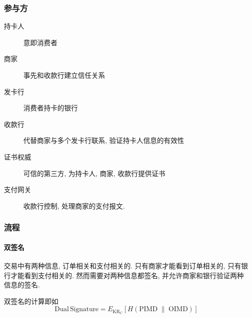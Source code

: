 \documentclass{ctexart}
\begin{document}
\subsubsection{参与方}
    \begin{description}
        \item[持卡人]   意即消费者
        \item[商家]     事先和收款行建立信任关系
        \item[发卡行]   消费者持卡的银行
        \item[收款行]   代替商家与多个发卡行联系, 验证持卡人信息的有效性
        \item[证书权威] 可信的第三方, 为持卡人, 商家, 收款行提供证书
        \item[支付网关] 收款行控制, 处理商家的支付报文.
    \end{description}
\subsubsection{流程}
\paragraph{双签名} 交易中有两种信息, 订单相关和支付相关的.
    只有商家才能看到订单相关的, 只有银行才能看到支付相关的.
    然而需要对两种信息都签名, 并允许商家和银行验证两种信息的签名.\par
    双签名的计算即如\[
        \mathrm{Dual\,Signature} = E_{\mathrm{KR}_C} [H(\mathrm{PIMD} \;\|\; \mathrm{OIMD})] \]
\end{document}
